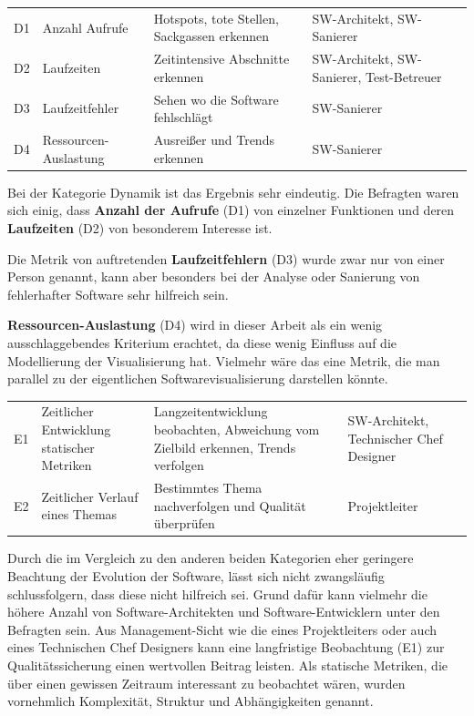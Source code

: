 \begin{tabularx}{\textwidth}{lp{2.5cm}Lp{2.6cm}l}
	\caption{\textbf{Dynamik} -- Gewünschte Metriken}\label{tab:dynamic-metrics} \\
	\tableheader
	D1 & Anzahl Aufrufe & Hotspots, tote Stellen, Sackgassen erkennen & SW-Architekt, SW-Sanierer & 
		 \\
	D2 & Laufzeiten & Zeitintensive Abschnitte erkennen & SW-Architekt, SW-Sanierer, Test-Betreuer & 
		 \\
	D3 & Laufzeitfehler & Sehen wo die Software fehlschlägt & SW-Sanierer & 
		 \\
	D4 & Ressourcen-Auslastung & Ausreißer und Trends erkennen & SW-Sanierer & 
		 \\
\end{tabularx}

Bei der Kategorie Dynamik ist das Ergebnis sehr eindeutig. Die Befragten waren sich einig, dass \textbf{Anzahl der Aufrufe} (D1) von einzelner Funktionen und deren \textbf{Laufzeiten} (D2) von besonderem Interesse ist. 

Die Metrik von auftretenden \textbf{Laufzeitfehlern} (D3) wurde zwar nur von einer Person genannt, kann aber besonders bei der Analyse oder Sanierung von fehlerhafter Software sehr hilfreich sein.

\textbf{Ressourcen-Auslastung} (D4) wird in dieser Arbeit als ein wenig ausschlaggebendes Kriterium erachtet, da diese wenig Einfluss auf die Modellierung der Visualisierung hat. Vielmehr wäre das eine Metrik, die man parallel zu der eigentlichen Softwarevisualisierung darstellen könnte.

\begin{tabularx}{\textwidth}{lP{2.5cm}Lp{2.6cm}l}
	\caption{\textbf{Evolution} -- Gewünschte Metriken}\label{tab:evolution-metrics} \\
	\tableheader
	E1 & Zeitlicher Entwicklung statischer Metriken & Langzeit\-entwicklung beobachten, Abweichung vom Zielbild erkennen, Trends verfolgen & SW-Architekt, Technischer Chef Designer & 
	 \\
	E2 & Zeitlicher Verlauf eines Themas & Bestimmtes Thema nachverfolgen und Qualität überprüfen & Projektleiter & 
	 \\
\end{tabularx}

Durch die im Vergleich zu den anderen beiden Kategorien eher geringere Beachtung der Evolution der Software, lässt sich nicht zwangsläufig schlussfolgern, dass diese nicht hilfreich sei. Grund dafür kann vielmehr die höhere Anzahl von Software-Architekten und Software-Entwicklern unter den Befragten sein. Aus Management-Sicht wie die eines Projektleiters oder auch eines Technischen Chef Designers kann eine langfristige Beobachtung (E1) zur Qualitätssicherung einen wertvollen Beitrag leisten. Als statische Metriken, die über einen gewissen Zeitraum interessant zu beobachtet wären, wurden vornehmlich Komplexität, Struktur und Abhängigkeiten genannt.

